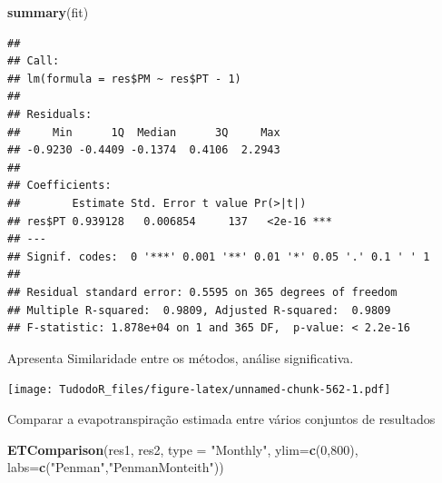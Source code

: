 \documentclass[
]{book}
\newenvironment{Shaded}{\begin{snugshade}}{\end{snugshade}}
\newcommand{\DataTypeTok}[1]{\textcolor[rgb]{0.13,0.29,0.53}{#1}}
\newcommand{\DecValTok}[1]{\textcolor[rgb]{0.00,0.00,0.81}{#1}}
\newcommand{\KeywordTok}[1]{\textcolor[rgb]{0.13,0.29,0.53}{\textbf{#1}}}
\newcommand{\NormalTok}[1]{#1}
\newcommand{\OperatorTok}[1]{\textcolor[rgb]{0.81,0.36,0.00}{\textbf{#1}}}
\newcommand{\StringTok}[1]{\textcolor[rgb]{0.31,0.60,0.02}{#1}}
\begin{document}
\begin{Shaded}
\begin{Highlighting}[]
\KeywordTok{summary}\NormalTok{(fit)}
\end{Highlighting}
\end{Shaded}

\begin{verbatim}
## 
## Call:
## lm(formula = res$PM ~ res$PT - 1)
## 
## Residuals:
##     Min      1Q  Median      3Q     Max 
## -0.9230 -0.4409 -0.1374  0.4106  2.2943 
## 
## Coefficients:
##        Estimate Std. Error t value Pr(>|t|)    
## res$PT 0.939128   0.006854     137   <2e-16 ***
## ---
## Signif. codes:  0 '***' 0.001 '**' 0.01 '*' 0.05 '.' 0.1 ' ' 1
## 
## Residual standard error: 0.5595 on 365 degrees of freedom
## Multiple R-squared:  0.9809, Adjusted R-squared:  0.9809 
## F-statistic: 1.878e+04 on 1 and 365 DF,  p-value: < 2.2e-16
\end{verbatim}

Apresenta Similaridade entre os métodos, análise significativa.

\begin{Shaded}
\end{Shaded}

\texttt{[image: TudodoR\_files/figure-latex/unnamed-chunk-562-1.pdf]}

Comparar a evapotranspiração estimada entre vários conjuntos de resultados

\begin{Shaded}
\begin{Highlighting}[]
\KeywordTok{ETComparison}\NormalTok{(res1, res2, }\DataTypeTok{type =} \StringTok{"Monthly"}\NormalTok{, }\DataTypeTok{ylim=}\KeywordTok{c}\NormalTok{(}\DecValTok{0}\NormalTok{,}\DecValTok{800}\NormalTok{),}
             \DataTypeTok{labs=}\KeywordTok{c}\NormalTok{(}\StringTok{"Penman"}\NormalTok{,}\StringTok{"PenmanMonteith"}\NormalTok{))}
\end{Highlighting}
\end{Shaded}
\end{document}
